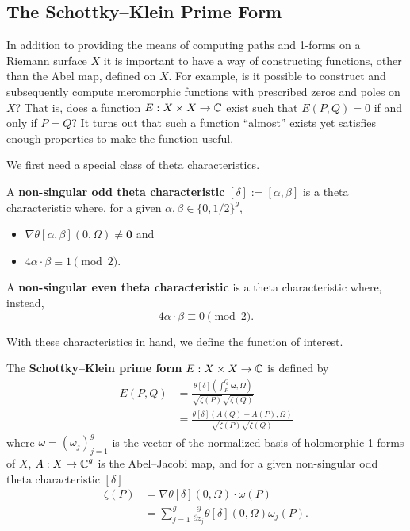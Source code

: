 \subsection{The Schottky--Klein Prime Form}


In addition to providing the means of computing paths and 1-forms on a
Riemann surface $X$ it is important to have a way of constructing
functions, other than the Abel map, defined on $X$. For example, is it
possible to construct and subsequently compute meromorphic functions
with prescribed zeros and poles on $X$? That is, does a function $E : X
\times X \to \operatorname{\mathbb{C}}$ exist such that $E(P,Q) = 0$ if and only if $P = Q$?
It turns out that such a function ``almost'' exists yet satisfies enough
properties to make the function useful.

We first need a special class of theta characteristics.
\begin{definition}
  A {\bf non-singular odd theta characteristic} $[\delta] := [\alpha,
    \beta]$ is a theta characteristic where, for a given $\alpha,\beta
  \in \{0,1/2\}^g$,
  \begin{itemize}
    \item $\nabla\theta[\alpha,\beta](0,\Omega) \neq \mathbf{0}$ and
    \item $4 \alpha \cdot \beta \equiv 1 \pmod{2}$.
  \end{itemize}
  A {\bf non-singular even theta characteristic} is a theta
  characteristic where, instead,
  \[
      4 \alpha \cdot \beta \equiv 0 \pmod{2}.
  \]
\end{definition}

With these characteristics in hand, we define the function of interest.
\begin{definition}
  The {\bf Schottky--Klein prime form} $E: X \times X \to \operatorname{\mathbb{C}}$ is defined
  by
  \begin{align*}
    E(P,Q)
    &=
    \frac{
      \theta[\delta]
      \left( \int_{P}^{Q}\mathbf{\omega},\Omega \right)
    }
    {
      \sqrt{\zeta(P)}\sqrt{\zeta(Q)}
    } \\
    &=
    \frac{
      \theta[\delta]
      \left( A(Q) - A(P), \Omega \right)
    }
    {
      \sqrt{\zeta(P)}\sqrt{\zeta(Q)}
    }
  \end{align*}
  where $\omega = (\omega_j)_{j=1}^g$ is the vector of the normalized
  basis of holomorphic 1-forms of $X$, $A: X \to \operatorname{\mathbb{C}}^g$ is the
  Abel--Jacobi map, and for a given non-singular odd theta
  characteristic $[\delta]$
  \begin{align*}
    \zeta(P)
    &= \nabla \theta[\delta](0,\Omega) \cdot \omega(P) \\
    &= \sum_{j=1}^g \frac{\partial}{\partial z_j}
    \theta[\delta](0,\Omega) \omega_j(P).
  \end{align*}
\end{definition}

